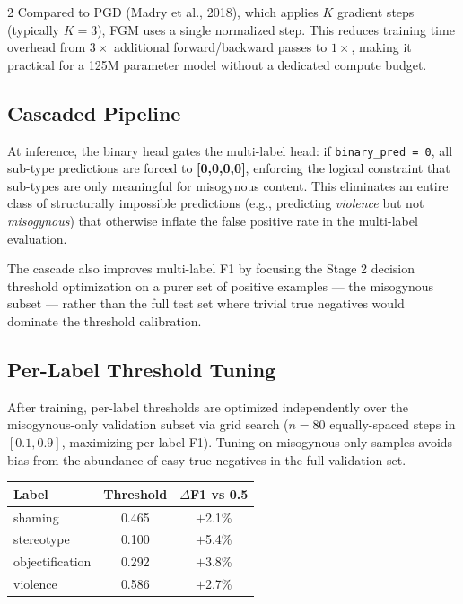 \documentclass[11pt]{article}
\begin{document}
\begin{multicols}{2}
Compared to PGD (Madry et al., 2018), which applies $K$ gradient steps (typically $K=3$), FGM uses a single normalized step. This reduces training time overhead from $3\times$ additional forward/backward passes to $1\times$, making it practical for a 125M parameter model without a dedicated compute budget.

\subsection{Cascaded Pipeline}

At inference, the binary head gates the multi-label head: if \texttt{binary\_pred = 0}, all sub-type predictions are forced to \textbf{[0,0,0,0]}, enforcing the logical constraint that sub-types are only meaningful for misogynous content. This eliminates an entire class of structurally impossible predictions (e.g., predicting \textit{violence} but not \textit{misogynous}) that otherwise inflate the false positive rate in the multi-label evaluation.

The cascade also improves multi-label F1 by focusing the Stage 2 decision threshold optimization on a purer set of positive examples — the misogynous subset — rather than the full test set where trivial true negatives would dominate the threshold calibration.

\subsection{Per-Label Threshold Tuning}

After training, per-label thresholds are optimized independently over the misogynous-only validation subset via grid search ($n=80$ equally-spaced steps in $[0.1, 0.9]$, maximizing per-label F1). Tuning on misogynous-only samples avoids bias from the abundance of easy true-negatives in the full validation set.

\begin{center}
\small
\begin{tabular}{lcc}
\toprule
\textbf{Label} & \textbf{Threshold} & \textbf{$\Delta$F1 vs 0.5} \\
\midrule
shaming         & 0.465 & $+$2.1\% \\
stereotype      & 0.100 & $+$5.4\% \\
objectification & 0.292 & $+$3.8\% \\
violence        & 0.586 & $+$2.7\% \\
\bottomrule
\end{tabular}
\end{center}


\end{multicols}
\end{document}

